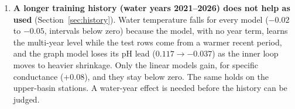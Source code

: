 \documentclass[11pt]{article}
\begin{document}
\begin{enumerate}
        (Table~\ref{tab:neighbour}): $+0.12$ to $+0.14$ for every conventional model, with intervals
        above zero, and $0.117\to0.178$ for the graph model, the best LOO pH so far. They add about
        $0.05$ to the linear models for specific conductance and nothing to the graph model. This
        is a different task (live neighbours required), so it should be reported separately from
        prediction from map features alone.
  \item \textbf{A longer training history (water years 2021--2026) does not help as used}
        (Section~\ref{sec:history}). Water temperature falls for every model ($-0.02$ to $-0.05$,
        intervals below zero) because the model, with no year term, learns the multi-year level
        while the test rows come from a warmer recent period, and the graph model loses its pH lead
        ($0.117\to-0.037$) as the inner loop moves to heavier shrinkage. Only the linear models gain,
        for specific conductance ($+0.08$), and they stay below zero. The same holds on the
        upper-basin stations. A water-year effect is needed before the history can be judged.
\end{enumerate}
\end{document}
